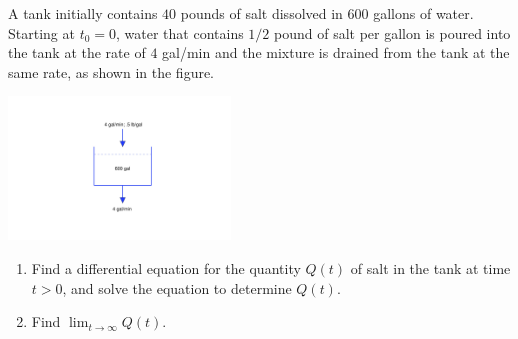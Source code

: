 \documentclass{ximera}
\begin{document}
\begin{example}\label{example:4.2.3}
A tank initially contains $40$ pounds of salt dissolved in 600 gallons
of water. Starting at $t_0 = 0$, water that contains $1/2$ pound of salt
per gallon is poured into the tank at the rate of $4$ gal/min and the
mixture is drained from the tank at the same rate, as shown in the figure.

\begin{image}
  \includegraphics[height=1.5in]{fig040203.jpg} 
\end{image}


\begin{enumerate}
\item \label{item:4.2.3a}
Find a differential equation for the quantity $Q(t)$ of salt in the
tank at time $t > 0$, and solve the equation to determine $Q(t)$.
\item \label{item:4.2.3b}
 Find $\lim_{t\rightarrow\infty}Q(t)$.
\end{enumerate}



\end{example}
\end{document}
